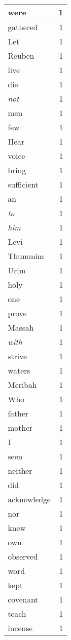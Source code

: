 \begin{center}
\begin{longtable}{l|r}
were & 1 \\ \hline
gathered & 1 \\ \hline
Let & 1 \\ \hline
Reuben & 1 \\ \hline
live & 1 \\ \hline
die & 1 \\ \hline
\emph{not} & 1 \\ \hline
men & 1 \\ \hline
few & 1 \\ \hline
Hear & 1 \\ \hline
voice & 1 \\ \hline
bring & 1 \\ \hline
sufficient & 1 \\ \hline
an & 1 \\ \hline
\emph{to} & 1 \\ \hline
\emph{him} & 1 \\ \hline
Levi & 1 \\ \hline
Thummim & 1 \\ \hline
Urim & 1 \\ \hline
holy & 1 \\ \hline
one & 1 \\ \hline
prove & 1 \\ \hline
Massah & 1 \\ \hline
\emph{with} & 1 \\ \hline
strive & 1 \\ \hline
waters & 1 \\ \hline
Meribah & 1 \\ \hline
Who & 1 \\ \hline
father & 1 \\ \hline
mother & 1 \\ \hline
I & 1 \\ \hline
seen & 1 \\ \hline
neither & 1 \\ \hline
did & 1 \\ \hline
acknowledge & 1 \\ \hline
nor & 1 \\ \hline
knew & 1 \\ \hline
own & 1 \\ \hline
observed & 1 \\ \hline
word & 1 \\ \hline
kept & 1 \\ \hline
covenant & 1 \\ \hline
teach & 1 \\ \hline
incense & 1 \\ \hline

\end{longtable}
\end{center}
